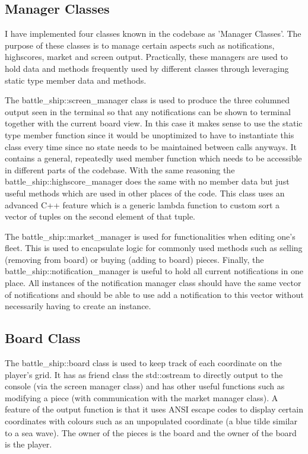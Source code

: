 \documentclass[11pt]{article} %
\begin{document}
\subsection{Manager Classes}
I have implemented four classes known in the codebase as 'Manager Classes'.
The purpose of these classes is to manage certain aspects such as notifications, highscores, market and screen output.
Practically, these managers are used to hold data and methods frequently used by different classes through
leveraging static type member data and methods.
\\
\par The battle\_ship::screen\_manager class is used to produce the three columned output seen in the terminal
so that any notifications can be shown to terminal together with the current board view.
In this case it makes sense to use the static type member function since it would be unoptimized to
have to instantiate this class every time since no state needs to be maintained between calls anyways.
It contains a general, repeatedly used member function which needs to be accessible in different parts of the codebase.
With the same reasoning the battle\_ship::highscore\_manager does the same with no member data but just useful methods
which are used in other places of the code. This class uses an advanced C++ feature which is a generic lambda function
to custom sort a vector of tuples on the second element of that tuple.
\\
\par The battle\_ship::market\_manager is used for functionalities when editing one's fleet.
This is used to encapsulate logic for commonly used methods such as selling (removing from board) or buying (adding to board) pieces.
Finally, the battle\_ship::notification\_manager is useful to hold all current notifications in one place.
All instances of the notification manager class should have the same vector of notifications and should be able
to use add a notification to this vector without necessarily having to create an instance.
\subsection{Board Class}
The battle\_ship::board class is used to keep track of each coordinate on the player's grid.
It has as friend class the std::ostream to directly output to the console (via the screen manager class)
and has other useful functions such as modifying a piece (with communication with the market manager class).
A feature of the output function is that it uses ANSI escape codes to display certain coordinates with colours such as an unpopulated
coordinate (a blue tilde similar to a sea wave).
The owner of the pieces is the board and the owner of the board is the player.
\end{document}
